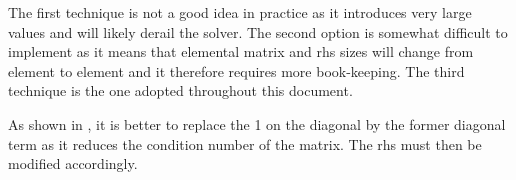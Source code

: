 The first technique is not a good idea in practice as it introduces very large 
values and will likely derail the solver. The second option is somewhat difficult
to implement as it means that elemental matrix and rhs sizes will change from 
element to element and it therefore requires more book-keeping.
The third technique is the one adopted throughout this document. 

As shown in \cite{wuxl08}, it is better to replace the 1 on the diagonal 
by the former diagonal term as it reduces the condition number of the matrix. 
The rhs must then be modified accordingly.
 
